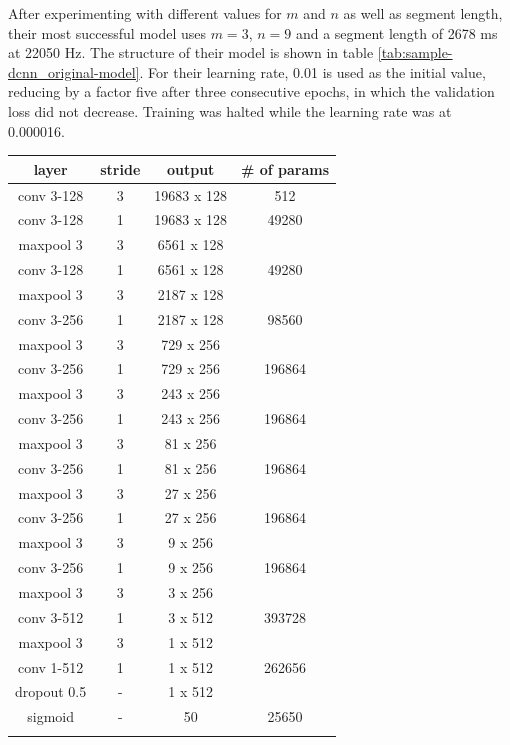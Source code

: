 After experimenting with different values for $m$ and $n$ as well as segment length, their most successful model uses $m=3$, $n=9$ and a segment length of 2678 ms at 22050 Hz. The structure of their model is shown in table \ref{tab:sample-dcnn_original-model}. For their learning rate, 0.01 is used as the initial value, reducing by a factor five after three consecutive epochs, in which the validation loss did not decrease. Training was halted while the learning rate was at 0.000016.

\begin{center}
	\begin{tabular}{ c c c c}
		
		layer & stride & output & \# of params\\
		\hline
		\hline
		conv 3-128 & 3 & 19683 x 128 & 512 \\
		\hline
		conv 3-128 & 1 & 19683 x 128 & 49280 \\
		maxpool 3 & 3 & 6561 x 128 & \\
		\hline
		conv 3-128 & 1 & 6561 x 128 & 49280 \\
		maxpool 3 & 3 & 2187 x 128 & \\
		\hline
		conv 3-256 & 1 & 2187 x 128 & 98560 \\
		maxpool 3 & 3 & 729 x 256 & \\
		\hline
		conv 3-256 & 1 & 729 x 256 & 196864 \\
		maxpool 3 & 3 & 243 x 256 & \\
		\hline
		conv 3-256 & 1 & 243 x 256 & 196864 \\
		maxpool 3 & 3 & 81 x 256 & \\
		\hline
		conv 3-256 & 1 & 81 x 256 & 196864 \\
		maxpool 3 & 3 & 27 x 256 & \\
		\hline
		conv 3-256 & 1 & 27 x 256 & 196864 \\
		maxpool 3 & 3 & 9 x 256 & \\
		\hline
		conv 3-256 & 1 & 9 x 256 & 196864 \\
		maxpool 3 & 3 & 3 x 256 & \\
		\hline
		conv 3-512 & 1 & 3 x 512 & 393728 \\
		maxpool 3 & 3 & 1 x 512 & \\
		\hline
		conv 1-512 & 1 & 1 x 512 & 262656 \\
		dropout 0.5 & - & 1 x 512 & \\
		\hline
		sigmoid & - & 50 & 25650 \\
		
		& & & \\	
	\end{tabular}
	\label{tab:sample-dcnn_original-model}
\end{center}


